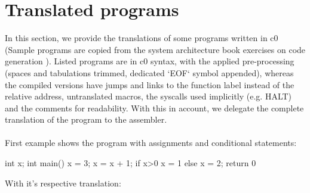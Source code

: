 \section{Translated programs}
In this section, we provide the translations of some programs written in c0 (Sample programs are copied from the system architecture book exercises on code generation \cite{sysbook}).
Listed programs are in c0 syntax, with the applied pre-processing (spaces and tabulations trimmed, dedicated `EOF` symbol appended),
whereas the compiled versions have jumps and links to the function label instead of the relative address, untranslated macros, the syscalls
used implicitly (e.g. HALT) and the comments for readability. With this in account, we delegate the complete translation of the program to the assembler.\\~\\
First example shows the program with assignments and conditional statements:
\begin{codeblock}
int x;
int main(){
x = 3;
x = x + 1;
if x>0 {x = 1} else {x = 2};
return 0
}~
\end{codeblock}
With it's respective translation:

